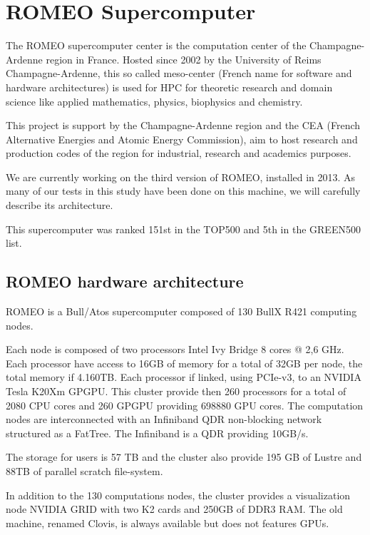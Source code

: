 \section{ROMEO Supercomputer}
The ROMEO supercomputer center is the computation center of the Champagne-Ardenne region in France. 
Hosted since 2002 by the University of Reims Champagne-Ardenne, this so called meso-center (French name for software and hardware architectures) is used for HPC for theoretic research and domain science like applied mathematics, physics, biophysics and chemistry. 

This project is support by the Champagne-Ardenne region and the CEA (French Alternative Energies and Atomic Energy Commission), aim to host research and production codes of the region for industrial, research and academics purposes. 

We are currently working on the third version of ROMEO, installed in 2013. 
As many of our tests in this study have been done on this machine, we will carefully describe its architecture. 

This supercomputer was ranked 151st in the TOP500 and 5th in the GREEN500 list. 

\subsection{ROMEO hardware architecture}
\label{sec:part1_ROMEO}
ROMEO is a Bull/Atos supercomputer composed of 130 BullX R421 computing nodes. 

Each node is composed of two processors Intel Ivy Bridge 8 cores @ 2,6 GHz. 
Each processor have access to 16GB of memory for a total of 32GB per node, the total memory if 4.160TB. 
Each processor if linked, using PCIe-v3, to an NVIDIA Tesla K20Xm GPGPU. 
This cluster provide then 260 processors for a total of 2080 CPU cores and 260 GPGPU providing 698880 GPU cores. 
The computation nodes are interconnected with an Infiniband QDR non-blocking network structured as a FatTree. 
The Infiniband is a QDR providing 10GB/s. 

The storage for users is 57 TB and the cluster also provide 195 GB of Lustre and 88TB of parallel scratch file-system. 

In addition to the 130 computations nodes, the cluster provides a visualization node NVIDIA GRID with two K2 cards and 250GB of DDR3 RAM. 
The old machine, renamed Clovis, is always available but does not features GPUs. 

